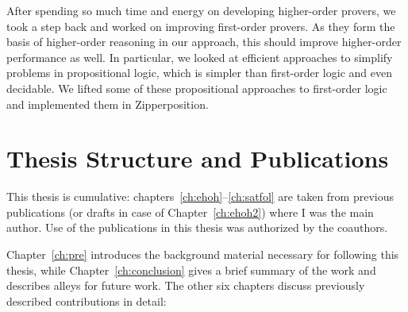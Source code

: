   
  After spending so much time and energy on developing higher-order provers, we
  took a step back and worked on improving first-order provers. As they form the
  basis of higher-order reasoning in our approach, this should improve
  higher-order performance as well. In particular, we looked at
  efficient approaches to simplify problems in propositional logic, which is
  simpler than first-order logic and even decidable. We lifted some of these
  propositional approaches to first-order logic and implemented them in Zipperposition. 

\section{Thesis Structure and Publications}

This thesis is cumulative: chapters~\ref{ch:ehoh}--\ref{ch:satfol}  are
taken from previous publications (or drafts in case of
Chapter~\ref{ch:ehoh2}) where I was the main author. Use
of the publications in this thesis was authorized by the coauthors. 

Chapter~\ref{ch:pre} introduces the background material necessary for following this thesis,
while Chapter~\ref{ch:conclusion} gives a brief summary of the work and describes alleys for future work.
The other six chapters discuss previously described contributions in detail:

